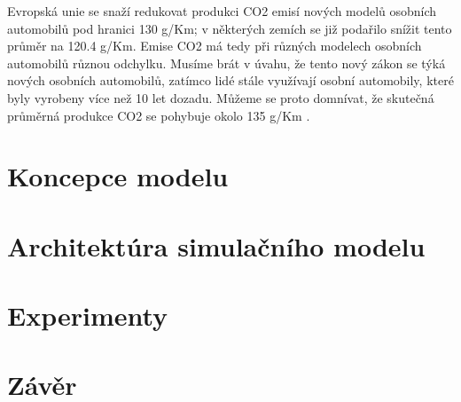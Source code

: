 \documentclass[a4paper, 11pt]{article}
\begin{document}
Evropská unie se snaží redukovat produkci CO2 emisí nových modelů osobních automobilů pod hranici 130 g/Km; v některých zemích se již podařilo snížit tento průměr na 120.4 g/Km. Emise CO2 má tedy při různých modelech osobních automobilů různou odchylku. Musíme brát v úvahu, že tento nový zákon se týká nových osobních automobilů, zatímco lidé stále využívají osobní automobily, které byly vyrobeny více než 10 let dozadu. Můžeme se proto domnívat, že skutečná průměrná produkce CO2 se pohybuje okolo 135 g/Km \cite{ultimatespecs.com}.





\section{Koncepce modelu}
\section{Architektúra simulačního modelu}
\section{Experimenty}
\section{Závěr}

\newpage


\end{document}
